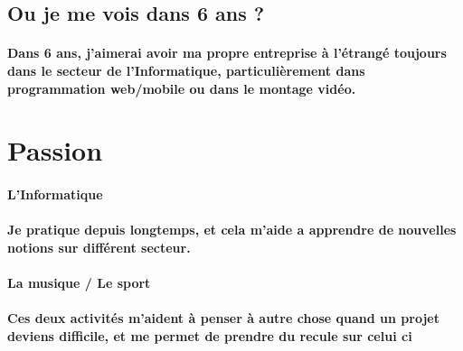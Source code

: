 \documentclass{article}
\begin{document}
\subsection{Ou je me vois dans 6 ans ?}
\paragraph{Dans 6 ans, j'aimerai avoir ma propre entreprise à l'étrangé toujours dans le secteur de l'Informatique,
 particulièrement dans programmation web/mobile ou dans le montage vidéo.}

\section{Passion}
\paragraph{L'Informatique}
\paragraph{Je pratique depuis longtemps, et cela m'aide a apprendre de nouvelles notions sur différent secteur. }
\paragraph{La musique / Le sport}
\paragraph{Ces deux activités m'aident à penser à autre chose quand un projet deviens difficile, et me permet de prendre du recule sur celui ci }
\end{document}
